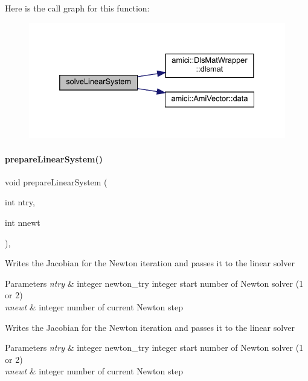Here is the call graph for this function\+:
\nopagebreak
\begin{figure}[H]
\begin{center}
\leavevmode
\includegraphics[width=332pt]{classamici_1_1_newton_solver_dense_aa4a6695d71f00ec1b46e94b33e55660f_cgraph}
\end{center}
\end{figure}
\mbox{\label{classamici_1_1_newton_solver_dense_a0b900656d018299b08d0f027e95bd347}} 
\paragraph{\texorpdfstring{prepareLinearSystem()}{prepareLinearSystem()}}
{\footnotesize\ttfamily void prepare\+Linear\+System (\begin{DoxyParamCaption}\item[{int}]{ntry,  }\item[{int}]{nnewt }\end{DoxyParamCaption})\hspace{0.3cm}{\ttfamily [override]}, {\ttfamily [virtual]}}

Writes the Jacobian for the Newton iteration and passes it to the linear solver


\begin{DoxyParams}{Parameters}
{\em ntry} & integer newton\+\_\+try integer start number of Newton solver (1 or 2) \\
\hline
{\em nnewt} & integer number of current Newton step \\
\hline
\end{DoxyParams}
Writes the Jacobian for the Newton iteration and passes it to the linear solver


\begin{DoxyParams}{Parameters}
{\em ntry} & integer newton\+\_\+try integer start number of Newton solver (1 or 2) \\
\hline
{\em nnewt} & integer number of current Newton step\\
\hline
\end{DoxyParams}



